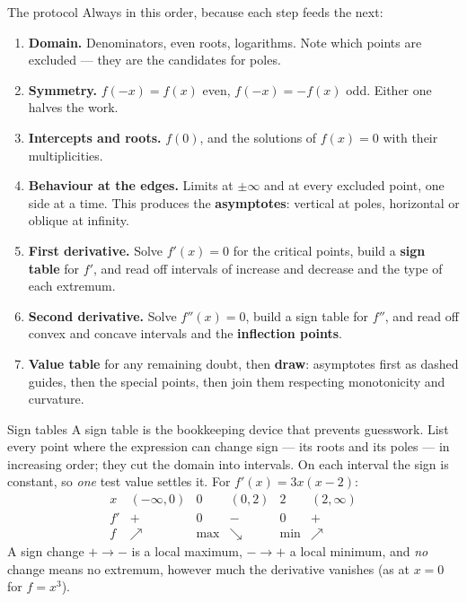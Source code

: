 \begin{rulebox}{The protocol}
Always in this order, because each step feeds the next:
\begin{enumerate}[leftmargin=1.8em,itemsep=0.35ex]
  \item \textbf{Domain.} Denominators, even roots, logarithms. Note which
        points are excluded --- they are the candidates for poles.
  \item \textbf{Symmetry.} $f(-x)=f(x)$ even, $f(-x)=-f(x)$ odd. Either one
        halves the work.
  \item \textbf{Intercepts and roots.} $f(0)$, and the solutions of
        $f(x)=0$ with their multiplicities.
  \item \textbf{Behaviour at the edges.} Limits at $\pm\infty$ and at every
        excluded point, one side at a time. This produces the
        \textbf{asymptotes}: vertical at poles, horizontal or oblique at
        infinity.
  \item \textbf{First derivative.} Solve $f'(x)=0$ for the critical points,
        build a \textbf{sign table} for $f'$, and read off intervals of
        increase and decrease and the type of each extremum.
  \item \textbf{Second derivative.} Solve $f''(x)=0$, build a sign table
        for $f''$, and read off convex and concave intervals and the
        \textbf{inflection points}.
  \item \textbf{Value table} for any remaining doubt, then \textbf{draw}:
        asymptotes first as dashed guides, then the special points, then
        join them respecting monotonicity and curvature.
\end{enumerate}
\end{rulebox}

\begin{rulebox}{Sign tables}
A sign table is the bookkeeping device that prevents guesswork. List every
point where the expression can change sign --- its roots and its poles ---
in increasing order; they cut the domain into intervals. On each interval
the sign is constant, so \emph{one} test value settles it. For
$f'(x)=3x(x-2)$:
\[
  \begin{array}{c|ccccc}
    x & (-\infty,0) & 0 & (0,2) & 2 & (2,\infty)\\\hline
    f' & + & 0 & - & 0 & +\\
    f & \nearrow & \text{max} & \searrow & \text{min} & \nearrow
  \end{array}
\]
A sign change $+\to-$ is a local maximum, $-\to+$ a local minimum, and
\emph{no} change means no extremum, however much the derivative vanishes
(as at $x=0$ for $f=x^{3}$).
\end{rulebox}


